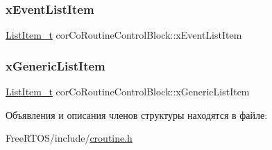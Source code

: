 \mbox{\label{structcor_co_routine_control_block_a105d316da0069f766acc3b210afed1b9}} 
\subsubsection{\texorpdfstring{xEventListItem}{xEventListItem}}
{\footnotesize\ttfamily \mbox{\hyperlink{list_8h_a1a62d469392f9bfe2443e7efab9c8398}{List\+Item\+\_\+t}} cor\+Co\+Routine\+Control\+Block\+::x\+Event\+List\+Item}

\mbox{\label{structcor_co_routine_control_block_aa2900494db8782eeb8ef12d482501406}} 
\subsubsection{\texorpdfstring{xGenericListItem}{xGenericListItem}}
{\footnotesize\ttfamily \mbox{\hyperlink{list_8h_a1a62d469392f9bfe2443e7efab9c8398}{List\+Item\+\_\+t}} cor\+Co\+Routine\+Control\+Block\+::x\+Generic\+List\+Item}



Объявления и описания членов структуры находятся в файле\+:\begin{DoxyCompactItemize}
\item 
Free\+R\+T\+O\+S/include/\mbox{\hyperlink{croutine_8h}{croutine.\+h}}\end{DoxyCompactItemize}
